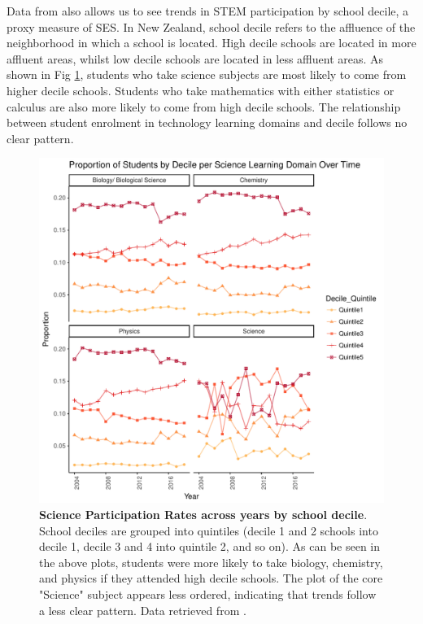 Data from \cite{EducationCounts_2018} also allows us to see trends in STEM participation by school decile, a proxy measure of SES. In New Zealand, school decile refers to the affluence of the neighborhood in which a school is located. High decile schools are located in more affluent areas, whilst low decile schools are located in less affluent areas. As shown in Fig \ref{fig:STEM_Participation_Decile}, students who take science subjects are most likely to come from higher decile schools. Students who take mathematics with either statistics or calculus are also more likely to come from high decile schools. The relationship between student enrolment in technology learning domains and decile follows no clear pattern.  
\begin{figure}
    \centering
    \includegraphics{C2 - Student Pathways/STEM_Participation_Y13_Proportion_Science_DecileQuintile.pdf}
    \caption{\textbf{Science Participation Rates across years by school decile}. School deciles are grouped into quintiles (decile 1 and 2 schools into decile 1, decile 3 and 4 into quintile 2, and so on). As can be seen in the above plots, students were more likely to take biology, chemistry, and physics if they attended high decile schools. The plot of the core "Science" subject appears less ordered, indicating that trends follow a less clear pattern. Data retrieved from \cite{EducationCounts_2018}.}
    \label{fig:STEM_Participation_Decile}
\end{figure}

